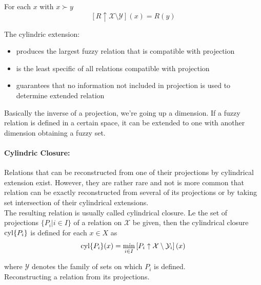 For each $x$ with $x \succ y$ 
$$ [R \uparrow \mathcal{X} \setminus \mathcal{Y}] (x) = R(y) $$

The cylindric extension: 
\begin{itemize}
	\item produces the largest fuzzy relation that is compatible with projection
	\item is the least specific of all relations compatible with projection
	\item guarantees that no information not included in projection is used to determine extended relation
\end{itemize}

Basically the inverse of a projection, we're going up a dimension. If a fuzzy relation is defined in a certain space, it can be extended to one with another dimension obtaining a fuzzy set.\\

\paragraph{Cylindric Closure:} Relations that can be reconstructed from one of their projections by cylindrical extension exist. However, they are rather rare and not is more common that relation can be exactly reconstructed from several of its projections or by taking set intersection of their cylindrical extensions. \\

The resulting relation is usually called cylindrical closure. Le the set of projections $\{P_i | i \in I\}$ of a relation on $\mathcal{X}$ be given, then the cylindrical closure $\operatorname*{cyl}\{P_i\}$ is defined for each $x \in X$ as
$$ \operatorname*{cyl} \{P_i\} (x) = \min_{i \in I} \left[P_i \uparrow \mathcal{X} \setminus \mathcal{Y}_i \right] (x) $$

where $\mathcal{Y}$ denotes the family of sets on which $P_i$ is defined.\\

Reconstructing a relation from its projections.\\

\newpage


